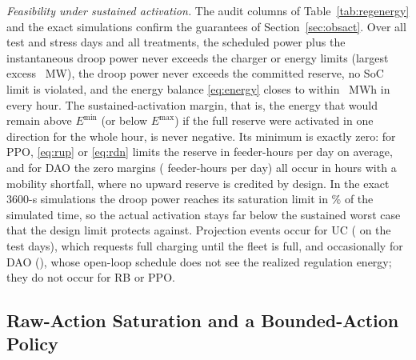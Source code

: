 \emph{Feasibility under sustained activation.} The audit columns of
Table~\ref{tab:regenergy} and the exact simulations confirm the
guarantees of Section~\ref{sec:obsact}. Over all test and stress days
and all treatments, the scheduled power plus the instantaneous droop
power never exceeds the charger or energy limits (largest excess
\TPPOPwExcess~MW), the droop power never exceeds the committed reserve,
no SoC limit is violated, and the energy balance \eqref{eq:energy}
closes to within \RegClosureMax~MWh in every hour. The
sustained-activation margin, that is, the energy that would remain
above $E^{\min}$ (or below $E^{\max}$) if the full reserve were
activated in one direction for the whole hour, is never negative. Its
minimum is exactly zero: for PPO, \eqref{eq:rup} or \eqref{eq:rdn}
limits the reserve in \TrkPPOBindHours{} feeder-hours per day on
average, and for DAO the zero margins (\TrkDAOBindHours{} feeder-hours
per day) all occur in hours with a mobility shortfall, where no upward
reserve is credited by design. In the exact 3600-s simulations the droop
power reaches its saturation limit in \TrkPPOSatFrac\% of the simulated
time, so the actual activation stays far below the sustained worst
case that the design limit protects against. Projection events occur
for UC (\TUCProj{} on the test days), which requests full charging
until the fleet is full, and occasionally for DAO (\TDAOProj), whose
open-loop schedule does not see the realized regulation energy; they do
not occur for RB or PPO.

\subsection{Raw-Action Saturation and a Bounded-Action Policy}
\label{sec:clip}

